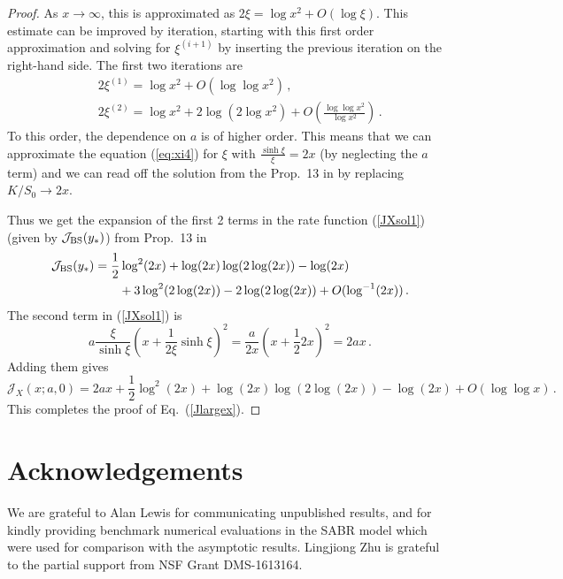 \documentclass[11pt]{article}
\numberwithin{equation}{section}
\theoremstyle{plain}
\begin{document}
\begin{proof}
As $x\to \infty$, this is approximated as $2\xi=\log x^2 + O(\log \xi)$.  
This estimate can be improved by iteration, starting with this first order
approximation and solving for $\xi^{(i+1)}$ by inserting the previous 
iteration on the right-hand side. The first two iterations are
\begin{eqnarray}
&& 2\xi^{(1)} = \log x^2 + O(\log\log x^2)\,, \\
&& 2\xi^{(2)} = \log x^2 + 2 \log(2 \log x^2) + 
O\left(\frac{\log\log x^2}{\log x^2}\right)\,.
\end{eqnarray}
To this order, the dependence on $a$ is of higher order. This means that 
we can approximate the equation (\ref{eq:xi4}) for $\xi$ 
with $\frac{\sinh \xi}{\xi}=2x$ (by neglecting the $a$ term)
and we can read off the solution from the Prop.~13 in \cite{PZSIFIN}
by replacing $K/S_0 \to 2x$. 


Thus we get the 
expansion of the first 2 terms in the rate function (\ref{JXsol1})
(given by $\mathcal{J}_{\rm BS}(y_*)$) from Prop.~13 in \cite{PZSIFIN}
\begin{align}
\mathcal{J}_{\rm BS}(y_*) &=
\frac12 \log^2 (2x) + \log(2x) \log(2\log(2x)) - \log(2x)\\
& 
\qquad + 
3 \log^2(2\log(2x)) - 2 \log(2\log(2x)) + O(\log^{-1}(2x))\,.
\nonumber
\end{align}
The second term in (\ref{JXsol1}) is
\begin{equation}
a \frac{\xi}{\sinh \xi} \left(x + \frac{1}{2\xi} \sinh\xi\right)^2 = 
\frac{a}{2x} \left(x +  \frac12 2x\right)^2 = 2ax\,.
\end{equation}
Adding them gives
\begin{equation*}
\mathcal{J}_X(x;a,0) = 2ax + \frac12 \log^2 (2x) + 
\log(2x) \log(2\log(2x))
- \log(2x) + O(\log\log x) \,.\nonumber
\end{equation*}
This completes the proof of Eq.~(\ref{Jlargex}).
\end{proof}






\section*{Acknowledgements}
We are grateful to Alan Lewis for communicating unpublished results, 
and for kindly providing benchmark numerical evaluations
in the SABR model which were used for comparison with the asymptotic 
results. 
Lingjiong Zhu is grateful to the partial support from NSF Grant DMS-1613164.
\end{document}
